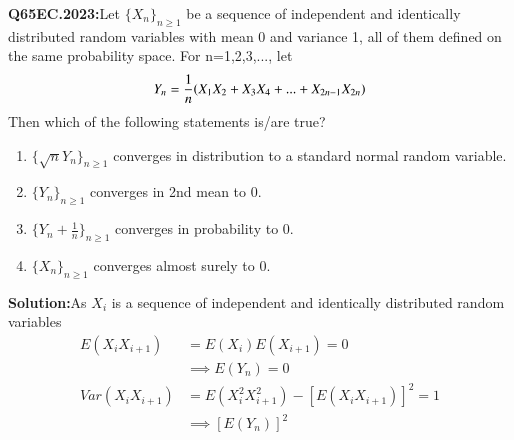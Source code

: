 \documentclass[journal,12pt,Twocolumn]{IEEEtran}
\theoremstyle{remark}
\begin{document}

\textbf{Q65EC.2023:}Let $\{X_n\}_{n \geq 1}$ be a sequence of independent and identically distributed random variables with mean 0 and variance 1, all of them defined on the same
probability space. For n=1,2,3,..., let
\begin{align}
Y_n=\frac{1}{n}{\left(X_1X_2+X_3X_4+...+X_{2n-1}X_{2n}\right)} 
\end{align}
Then which of the following statements is/are true? 
\begin{enumerate}[label=(\Alph*)]
\item $\{\sqrt{n}Y_n\}_{n \geq 1}$ converges in distribution to a standard normal random variable.
\item $\{Y_n\}_{n \geq 1}$ converges in 2nd mean to 0.
\item $\{Y_n+\frac{1}{n}\}_{n \geq 1}$ converges in probability to 0.
\item $\{X_n\}_{n \geq 1}$ converges almost surely to 0.
\end{enumerate}
\textbf{Solution:}As $X_i$ is a sequence of independent and identically distributed random variables
\begin{align}
E(X_iX_{i+1})&=E(X_i)E(X_{i+1})=0 \\
&\label{65/st/23:eq3}\implies E(Y_n)=0 \\
Var(X_iX_{i+1})&=E(X_{i}^2X_{i+1}^2)-[E(X_iX_{i+1})]^2 = 1 \\
&\label{65/st/23:eq5}\implies [E(Y_n)]^2
\end{align}
\end{document}
